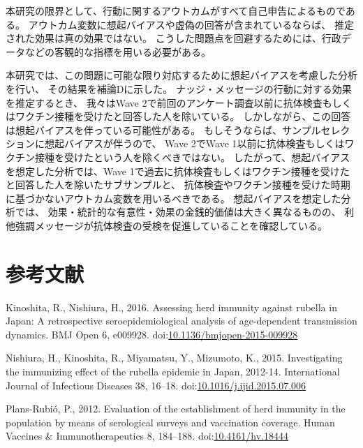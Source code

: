 \documentclass[
  11pt,
  a4paper,
]{article}
\newlength{\cslhangindent}
\newlength{\cslentryspacingunit} %
\newenvironment{CSLReferences}[2] %
 {%
  \setlength{\parindent}{0pt}
  \ifodd #1
  \let\oldpar\par
  \def\par{\hangindent=\cslhangindent\oldpar}
  \fi
  \setlength{\parskip}{#2\cslentryspacingunit}
 }%
 {}
\begin{document}
本研究の限界として、行動に関するアウトカムがすべて自己申告によるものである。
アウトカム変数に想起バイアスや虚偽の回答が含まれているならば、
推定された効果は真の効果ではない。
こうした問題点を回避するためには、行政データなどの客観的な指標を用いる必要がある。

本研究では、この問題に可能な限り対応するために想起バイアスを考慮した分析を行い、
その結果を補論Dに示した。
ナッジ・メッセージの行動に対する効果を推定するとき、
我々はWave 2で前回のアンケート調査以前に抗体検査もしくはワクチン接種を受けたと回答した人を除いている。
しかしながら、この回答は想起バイアスを伴っている可能性がある。
もしそうならば、サンプルセレクションに想起バイアスが伴うので、
Wave 2でWave 1以前に抗体検査もしくはワクチン接種を受けたという人を除くべきではない。
したがって、想起バイアスを想定した分析では、Wave 1で過去に抗体検査もしくはワクチン接種を受けたと回答した人を除いたサブサンプルと、
抗体検査やワクチン接種を受けた時期に基づかないアウトカム変数を用いるべきである。
想起バイアスを想定した分析では、
効果・統計的な有意性・効果の金銭的価値は大きく異なるものの、
利他強調メッセージが抗体検査の受検を促進していることを確認している。

\newpage

\hypertarget{ux53c2ux8003ux6587ux732e}{%
\section*{参考文献}\label{ux53c2ux8003ux6587ux732e}}

\hypertarget{refs}{}
\begin{CSLReferences}{1}{0}
\leavevmode{}%
Kinoshita, R., Nishiura, H., 2016. Assessing herd immunity against rubella in {Japan}: A retrospective seroepidemiological analysis of age-dependent transmission dynamics. BMJ Open 6, e009928. doi:\href{https://doi.org/10.1136/bmjopen-2015-009928}{10.1136/bmjopen-2015-009928}

\leavevmode{}%
Nishiura, H., Kinoshita, R., Miyamatsu, Y., Mizumoto, K., 2015. Investigating the immunizing effect of the rubella epidemic in {Japan}, 2012-14. International Journal of Infectious Diseases 38, 16--18. doi:\href{https://doi.org/10.1016/j.ijid.2015.07.006}{10.1016/j.ijid.2015.07.006}

\leavevmode{}%
Plans-Rubió, P., 2012. Evaluation of the establishment of herd immunity in the population by means of serological surveys and vaccination coverage. Human Vaccines \& Immunotherapeutics 8, 184--188. doi:\href{https://doi.org/10.4161/hv.18444}{10.4161/hv.18444}

\end{CSLReferences}
\end{document}

